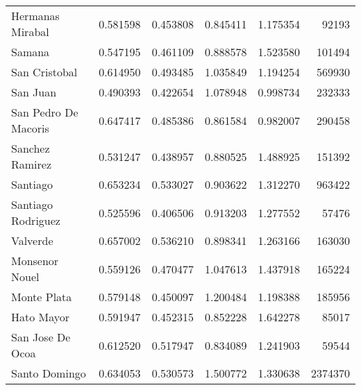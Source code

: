 \begin{tabular}{lrrrrr}
       Hermanas Mirabal &     0.581598 &     0.453808 &    0.845411 &    1.175354 &    92193 \\
                 Samana &     0.547195 &     0.461109 &    0.888578 &    1.523580 &   101494 \\
          San Cristobal &     0.614950 &     0.493485 &    1.035849 &    1.194254 &   569930 \\
               San Juan &     0.490393 &     0.422654 &    1.078948 &    0.998734 &   232333 \\
   San Pedro De Macoris &     0.647417 &     0.485386 &    0.861584 &    0.982007 &   290458 \\
        Sanchez Ramirez &     0.531247 &     0.438957 &    0.880525 &    1.488925 &   151392 \\
               Santiago &     0.653234 &     0.533027 &    0.903622 &    1.312270 &   963422 \\
     Santiago Rodriguez &     0.525596 &     0.406506 &    0.913203 &    1.277552 &    57476 \\
               Valverde &     0.657002 &     0.536210 &    0.898341 &    1.263166 &   163030 \\
         Monsenor Nouel &     0.559126 &     0.470477 &    1.047613 &    1.437918 &   165224 \\
            Monte Plata &     0.579148 &     0.450097 &    1.200484 &    1.198388 &   185956 \\
             Hato Mayor &     0.591947 &     0.452315 &    0.852228 &    1.642278 &    85017 \\
       San Jose De Ocoa &     0.612520 &     0.517947 &    0.834089 &    1.241903 &    59544 \\
          Santo Domingo &     0.634053 &     0.530573 &    1.500772 &    1.330638 &  2374370 \\
\bottomrule
\end{tabular}
